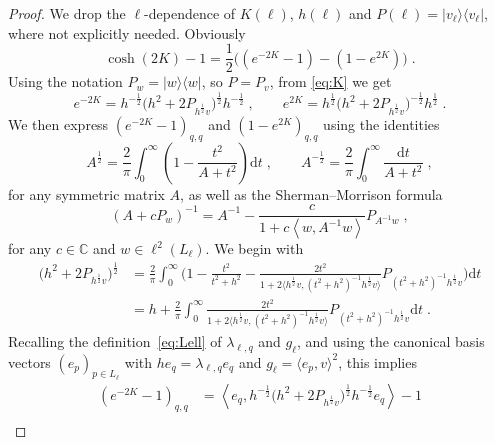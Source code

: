 \documentclass[12pt,a4paper]{article}
\numberwithin{equation}{section}
\newcommand{\1}{\mathbb{I}}
\newcommand{\C}{\mathbb{C}}
\newcommand{\half}{\frac{1}{2}}
\newcommand{\eva}[1]{\left\langle #1 \right\rangle}
\theoremstyle{plain}
\theoremstyle{definition}
\theoremstyle{remark}
\theoremstyle{plain}
\theoremstyle{definition}
\theoremstyle{remark}
\begin{document}
\begin{proof}
We drop the $ \ell $-dependence of $K(\ell) $, $ h(\ell) $ and $ P(\ell) = |v_\ell \rangle \langle v_\ell| $, where not explicitly needed. Obviously
\begin{equation} \label{eq:coshrewriting}
	\cosh(2K)-1
	= \half\big((e^{-2K}-1)-(1-e^{2K})\big) \;.
\end{equation}
Using the notation $ P_w = |w \rangle \langle w| $, so $ P = P_v $, from \eqref{eq:K} we get
\begin{equation} \label{eq:e-2k}
	e^{-2K} = h^{-\half} \big(h^2 +2P_{h^{\half} v}\big)^{\half} h^{-\half} \;, \qquad
	e^{2K} = h^{\half} \big(h^2 +2P_{h^{\half} v}\big)^{-\half} h^{\half} \;.
\end{equation}
We then express $ (e^{-2K}-1)_{q,q} $ and $ (1-e^{2K})_{q,q} $ using the identities
\begin{equation} \label{eq:intid}
	A^\half = \frac{2}{\pi} \int_0^\infty \left(1- \frac{t^2}{A+t^2}\right) \mathrm{d}t \;,\qquad
	A^{-\half} = \frac{2}{\pi} \int_0^\infty \frac{\mathrm{d}t}{A+t^2} \;,
\end{equation}
for any symmetric matrix $ A $, as well as the Sherman--Morrison formula
\begin{equation} \label{eq:shermor}
	(A+cP_w)^{-1} = A^{-1} - \frac{c}{1+c\eva{w, A^{-1}w}}P_{A^{-1}w} \;,
\end{equation}
for any $ c \in \C $ and $ w \in \ell^2(L_\ell) $. We begin with 
\begin{align}
	\big(h^2 +2P_{h^{\half} v}\big)^{\half}
	&= \frac{2}{\pi} \int_0^\infty \Bigg( 1- \frac{t^2}{t^2+h^2} - \frac{2 t^2}{1+ 2 \big\langle h^{\half} v ,(t^2+h^2)^{-1} h^\half v \big\rangle } P_{(t^2+h^2)^{-1}h^{\half} v} \Bigg) \mathrm{d}t \nonumber\\
	&= h + \frac{2}{\pi} \int_0^\infty \frac{2t^2}{1+ 2 \big\langle h^{\half} v ,(t^2+h^2)^{-1} h^\half v \big\rangle }  P_{(t^2+h^2)^{-1}h^{\half} v}\mathrm{d}t \;.
\end{align}
Recalling the definition~\eqref{eq:Lell} of $ \lambda_{\ell,q} $ and $ g_\ell $, and using the canonical basis vectors $ (e_p)_{p \in L_\ell} $ with $ h e_q = \lambda_{\ell,q} e_q $ and $ g_\ell = \langle e_p,v \rangle^2 $, this implies
\begin{align}
	(e^{-2K}-1)_{q,q}
	&= \eva{e_q, h^{-\half} \big(h^2 +2P_{h^{\half} v}\big)^{\half} h^{-\half} e_q} - 1\nonumber\\

\end{align}
\end{proof}
\end{document}
